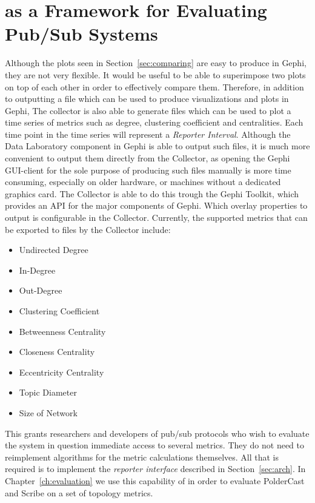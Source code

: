 \section{\demo as a Framework for Evaluating Pub/Sub Systems}
\label{sec:viz_eval}

Although the plots seen in Section~\ref{sec:comparing} are easy to
produce in Gephi, they are not very flexible. It would be useful to be
able to superimpose two plots on top of each other in order to
effectively compare them. Therefore, in addition to outputting a \gexf file which can be used to produce
visualizations and plots in Gephi, The collector is also able to generate \csv
files which can be used to plot a time series of metrics such as degree,
clustering coefficient and centralities. Each time point in the time
series will represent a \emph{Reporter Interval}. Although the Data
Laboratory component in Gephi is able to output such \csv files, it is
much more convenient to output them directly from the Collector, as
opening the Gephi GUI-client for the sole purpose of producing such
files manually is more time consuming, especially on older hardware, or
machines without a dedicated graphics card. The Collector is able to do
this trough the Gephi Toolkit, which provides an API for the major
components of Gephi. Which overlay properties to
output is configurable in the Collector.  Currently, the supported
metrics that can be exported to \csv files by the Collector include:

\begin{itemize}
    \item Undirected Degree
    \item In-Degree
    \item Out-Degree
    \item Clustering Coefficient
    \item Betweenness Centrality
    \item Closeness Centrality
    \item Eccentricity Centrality
    \item Topic Diameter
    \item Size of Network
\end{itemize}

This grants researchers and developers of pub/sub protocols who wish to evaluate
the system in question immediate access to several metrics. They do not need to
reimplement algorithms for the metric calculations themselves. All that is
required is to implement the \emph{reporter interface} described in
Section~\ref{sec:arch}. In Chapter~\ref{ch:evaluation} we use this capability of \demo in
order to evaluate PolderCast and Scribe on a set of topology metrics.

